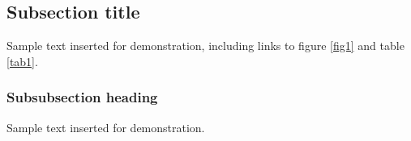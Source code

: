 \documentclass{iopjournal}
\begin{document}




\subsection{Subsection title}
Sample text inserted for demonstration, including links to figure \ref{fig1} and table \ref{tab1}.

\subsubsection{Subsubsection heading}
Sample text inserted for demonstration.
\end{document}
